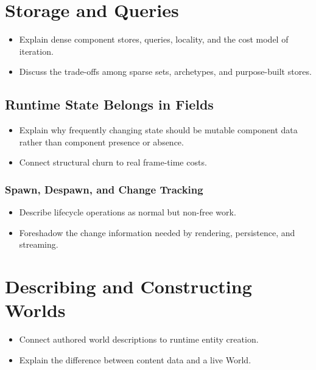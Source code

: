 \documentclass[
  11pt,
  letterpaper,
  DIV=11,
  numbers=noendperiod,
  twoside,
  open=right]{scrreprt}
\providecommand{\tightlist}{%
  \setlength{\itemsep}{0pt}\setlength{\parskip}{0pt}}
\begin{document}
\section{Storage and Queries}\label{storage-and-queries}

\begin{itemize}
\tightlist
\item
  Explain dense component stores, queries, locality, and the cost model
  of iteration.
\item
  Discuss the trade-offs among sparse sets, archetypes, and
  purpose-built stores.
\end{itemize}

\subsection{Runtime State Belongs in
Fields}\label{runtime-state-belongs-in-fields}

\begin{itemize}
\tightlist
\item
  Explain why frequently changing state should be mutable component data
  rather than component presence or absence.
\item
  Connect structural churn to real frame-time costs.
\end{itemize}

\subsubsection{Spawn, Despawn, and Change
Tracking}\label{spawn-despawn-and-change-tracking}

\begin{itemize}
\tightlist
\item
  Describe lifecycle operations as normal but non-free work.
\item
  Foreshadow the change information needed by rendering, persistence,
  and streaming.
\end{itemize}

\section{Describing and Constructing
Worlds}\label{describing-and-constructing-worlds}

\begin{itemize}
\tightlist
\item
  Connect authored world descriptions to runtime entity creation.
\item
  Explain the difference between content data and a live World.
\end{itemize}
\end{document}
